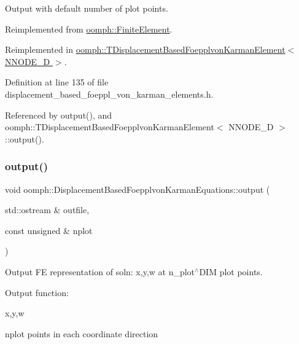 Output with default number of plot points. 



Reimplemented from \hyperlink{classoomph_1_1FiniteElement_a2ad98a3d2ef4999f1bef62c0ff13f2a7}{oomph\+::\+Finite\+Element}.



Reimplemented in \hyperlink{classoomph_1_1TDisplacementBasedFoepplvonKarmanElement_a1c3ad1317dc48f704d6d012a9c50724e}{oomph\+::\+T\+Displacement\+Based\+Foepplvon\+Karman\+Element$<$ N\+N\+O\+D\+E\+\_\+D $>$}.



Definition at line 135 of file displacement\+\_\+based\+\_\+foeppl\+\_\+von\+\_\+karman\+\_\+elements.\+h.



Referenced by output(), and oomph\+::\+T\+Displacement\+Based\+Foepplvon\+Karman\+Element$<$ N\+N\+O\+D\+E\+\_\+D $>$\+::output().

\mbox{\label{classoomph_1_1DisplacementBasedFoepplvonKarmanEquations_a675597ddd788e92dd6fb8d3bfed01c5b}} 
\subsubsection{\texorpdfstring{output()}{output()}\hspace{0.1cm}{\footnotesize\ttfamily [2/4]}}
{\footnotesize\ttfamily void oomph\+::\+Displacement\+Based\+Foepplvon\+Karman\+Equations\+::output (\begin{DoxyParamCaption}\item[{std\+::ostream \&}]{outfile,  }\item[{const unsigned \&}]{nplot }\end{DoxyParamCaption})\hspace{0.3cm}{\ttfamily [virtual]}}



Output FE representation of soln\+: x,y,w at n\+\_\+plot$^\wedge$\+D\+IM plot points. 

Output function\+:

x,y,w

nplot points in each coordinate direction 

